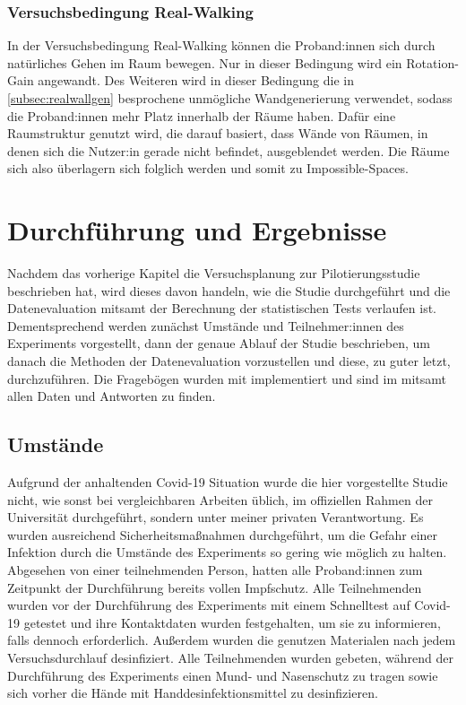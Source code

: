         \subsection{Versuchsbedingung Real-Walking}\label{subsec:realwalk}
            In der Versuchsbedingung Real-Walking können die Proband:innen sich durch natürliches Gehen im Raum bewegen. Nur in dieser Bedingung wird ein Rotation-Gain angewandt.
            Des Weiteren wird in dieser Bedingung die in \autoref{subsec:realwallgen} besprochene unmögliche Wandgenerierung verwendet, sodass die Proband:innen mehr Platz innerhalb der Räume haben. Dafür eine Raumstruktur genutzt wird, die darauf basiert, dass Wände von Räumen, in denen sich die Nutzer:in gerade nicht befindet, ausgeblendet werden. Die Räume sich also überlagern sich folglich werden und somit zu Impossible-Spaces.

\chapter{Durchführung und Ergebnisse}\label{}
    Nachdem das vorherige Kapitel die Versuchsplanung zur Pilotierungsstudie beschrieben hat, wird dieses davon handeln, wie die Studie durchgeführt und die Datenevaluation mitsamt der Berechnung der statistischen Tests verlaufen ist. Dementsprechend werden zunächst Umstände und Teilnehmer:innen des Experiments vorgestellt, dann der genaue Ablauf der Studie beschrieben, um danach die Methoden der Datenevaluation vorzustellen und diese, zu guter letzt, durchzuführen. Die Fragebögen wurden mit  implementiert und sind im  mitsamt allen Daten und Antworten zu finden.

    \section{Umstände}\label{sec:circumstances}
        Aufgrund der anhaltenden Covid-19 Situation wurde die hier vorgestellte Studie nicht, wie sonst bei vergleichbaren Arbeiten üblich, im offiziellen Rahmen der Universität durchgeführt, sondern unter meiner privaten Verantwortung. Es wurden ausreichend Sicherheitsmaßnahmen durchgeführt, um die Gefahr einer Infektion durch die Umstände des Experiments so gering wie möglich zu halten. Abgesehen von einer teilnehmenden Person, hatten alle Proband:innen zum Zeitpunkt der Durchführung bereits vollen Impfschutz.
        Alle Teilnehmenden wurden vor der Durchführung des Experiments mit einem Schnelltest auf Covid-19 getestet und ihre Kontaktdaten wurden festgehalten, um sie zu informieren, falls dennoch erforderlich. Außerdem wurden die genutzen Materialen nach jedem Versuchsdurchlauf desinfiziert.
        Alle Teilnehmenden wurden gebeten, während der Durchführung des Experiments einen Mund- und Nasenschutz zu tragen sowie sich vorher die Hände mit Handdesinfektionsmittel zu desinfizieren.

